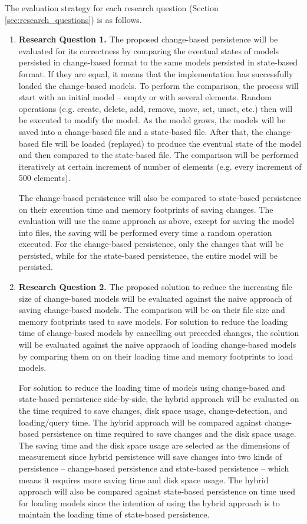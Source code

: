 \documentclass[12pt, a4paper]{report} \usepackage[titletoc]{appendix}
\begin{document}
The evaluation strategy for each research question (Section \ref{sec:research_questions}) is as follows. 
\begin{enumerate}
    \item \textbf{Research Question 1.} The proposed change-based persistence will be evaluated for its correctness by comparing the eventual states of models persisted in change-based format to the same models persisted in state-based format. If they are equal, it means that the implementation has successfully loaded the change-based models. To perform the comparison, the process will start with an initial model -- empty or with several elements. Random operations (e.g. create, delete, add, remove, move, set, unset, etc.) then will be executed to modify the model. As the model grows, the models will be saved into a change-based file and a state-based file. After that, the change-based file will be loaded (replayed) to produce the eventual state of the model and then compared to the state-based file. The comparison will be performed iteratively at certain increment of number of elements (e.g. every increment of 500 elements). 
    
    The change-based persistence will also be compared to state-based persistence on their execution time and memory footprints of saving changes. The evaluation will use the same approach as above, except for saving the model into files, the saving will be performed every time a random operation executed. For the change-based persistence, only the changes that will be persisted, while for the state-based persistence, the entire model will be persisted.
    
    \item \textbf{Research Question 2.} The proposed solution to reduce the increasing file size of change-based models will be evaluated against the naive approach of saving change-based models. The comparison will be on their file size and memory footprints used to save models. For solution to reduce the loading time of change-based models by cancelling out preceded changes, the solution will be evaluated against the naive appraoch of loading change-based models by comparing them on on their loading time and memory footprints to load models. 
    
    For solution to reduce the loading time of models using change-based and state-based persistence side-by-side,  the hybrid approach will be evaluated on the time required to save changes, disk space usage, change-detection, and loading/query time. The hybrid approach will be compared against change-based persistence on time required to save changes and the disk space usage. The saving time and the disk space usage are selected as the dimensions of measurement since hybrid persistence will save changes into two kinds of persistence -- change-based persistence and state-based persistence -- which means it requires more saving time and disk space usage. The hybrid approach will also be compared against state-based persistence on time used for loading models since the intention of using the hybrid approach is to maintain the loading time of state-based persistence. 
    

\end{enumerate}
\end{document}
